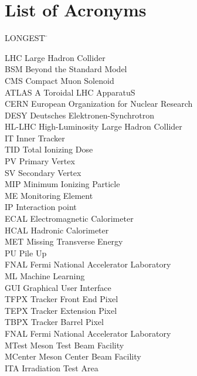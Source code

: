 

\chapter*{List of Acronyms}

\noindent
\vspace{-1.75\baselineskip}
\begin{tabbing}
	LONGEST \=  \kill %

	LHC \> Large Hadron Collider\\
	BSM \> Beyond the Standard Model\\
	CMS \> Compact Muon Solenoid\\
	ATLAS \> A Toroidal LHC ApparatuS\\
	CERN \> European Organization for Nuclear Research\\
	DESY \> Deutsches Elektronen-Synchrotron\\
	HL-LHC \> High-Luminosity Large Hadron Collider\\
	IT \> Inner Tracker\\
	TID \> Total Ionizing Dose\\
	PV \> Primary Vertex\\
	SV \> Secondary Vertex\\
	MIP \> Minimum Ionizing Particle\\
	ME \> Monitoring Element\\
	IP \> Interaction point\\
	ECAL \> Electromagnetic Calorimeter\\
	HCAL \> Hadronic Calorimeter\\
	MET \> Missing Transverse Energy\\
	PU \> Pile Up\\
	FNAL \> Fermi National Accelerator Laboratory\\
	ML \> Machine Learning\\
	GUI \> Graphical User Interface\\
	TFPX \> Tracker Front End Pixel\\
	TEPX \> Tracker Extension Pixel\\
	TBPX \> Tracker Barrel Pixel\\
	FNAL \> Fermi National Accelerator Laboratory\\
	MTest \> Meson Test Beam Facility\\
	MCenter \> Meson Center Beam Facility\\
	ITA \> Irradiation Test Area\\

\end{tabbing}

